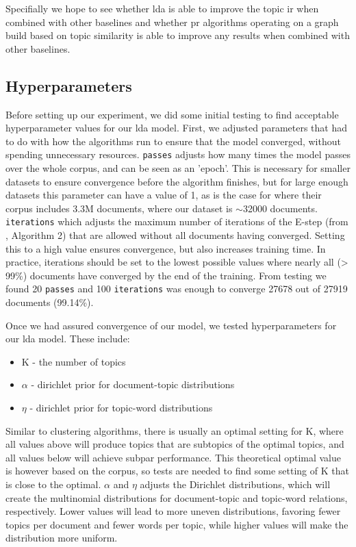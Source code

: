 Specifially we hope to see whether \gls{lda} is able to improve the topic \gls{ir} when combined with other baselines and whether \gls{pr} algorithms operating on a graph build based on topic similarity is able to improve any results when combined with other baselines.


\subsection{Hyperparameters}\label{subsec:hyperparameters}
Before setting up our experiment, we did some initial testing to find acceptable hyperparameter values for our \gls{lda} model.
First, we adjusted parameters that had to do with how the algorithms run to ensure that the model converged, without spending unnecessary resources.
\texttt{passes} adjusts how many times the model passes over the whole corpus, and can be seen as an 'epoch'. 
This is necessary for smaller datasets to ensure convergence before the algorithm finishes, but for large enough datasets this parameter can have a value of 1, as is the case for \cite{blei2010online} where their corpus includes 3.3M documents, where our dataset is $\sim$32000 documents.
\texttt{iterations} which adjusts the maximum number of iterations of the E-step (from \cite{}, Algorithm 2) that are allowed without all documents having converged. 
Setting this to a high value ensures convergence, but also increases training time. 
In practice, iterations should be set to the lowest possible values where nearly all (> 99\%) documents have converged by the end of the training.
From testing we found 20 \texttt{passes} and 100 \texttt{iterations} was enough to converge 27678 out of 27919 documents (99.14\%).

Once we had assured convergence of our model, we tested hyperparameters for our \gls{lda} model.
These include:
\begin{itemize}
	\item K - the number of topics
	\item $\alpha$ - dirichlet prior for document-topic distributions
	\item $\eta$ - dirichlet prior for topic-word distributions
\end{itemize}
Similar to clustering algorithms, there is usually an optimal setting for K, where all values above will produce topics that are subtopics of the optimal topics, and all values below will achieve subpar performance.
This theoretical optimal value is however based on the corpus, so tests are needed to find some setting of K that is close to the optimal.
$\alpha$ and $\eta$ adjusts the Dirichlet distributions, which will create the multinomial distributions for document-topic and topic-word relations, respectively.
Lower values will lead to more uneven distributions, favoring fewer topics per document and fewer words per topic, while higher values will make the distribution more uniform.

